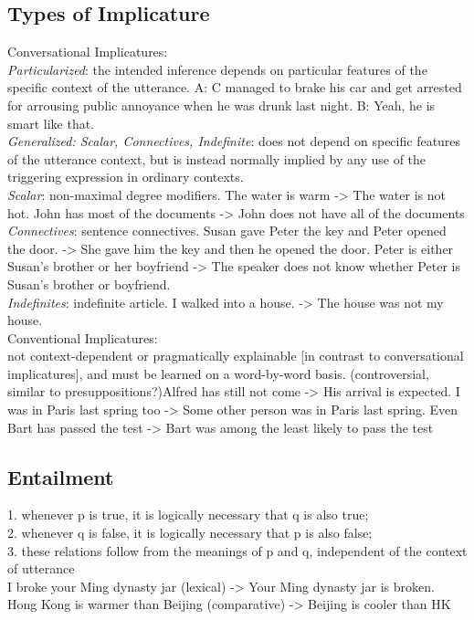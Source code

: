 \subsection*{Types of Implicature}
Conversational Implicatures:\\
\emph{Particularized}: the intended inference depends on particular features of the specific context of the utterance. {\tiny A: C managed to brake his car and get arrested for arrousing
public annoyance when he was drunk last night.
B: Yeah, he is smart like that.}\\
\emph{Generalized: Scalar, Connectives, Indefinite}: does not depend
on specific features of the utterance
context, but is instead normally implied by
any use of the triggering expression in
ordinary contexts.\\
\emph{Scalar}: non-maximal degree modifiers. {\tiny The water is warm -> The water is not hot. John has most of the documents -> John does not have all of the documents}\\
\emph{Connectives}: sentence connectives. {\tiny Susan gave Peter the key and Peter opened the door. -> She gave him the key and then he opened the door. Peter is either Susan’s brother or her boyfriend -> The speaker does not know whether Peter is Susan’s brother or boyfriend.}\\
\emph{Indefinites}: indefinite article. {\tiny I walked into a house. -> The house was not my house.}\\
Conventional Implicatures: \\
not context-dependent or pragmatically explainable [in contrast to conversational implicatures], and must be learned on a word-by-word basis. (controversial, similar to presuppositions?){\tiny Alfred has still not come -> His arrival is expected. I was in Paris last spring too -> Some other person was in Paris last spring. Even Bart has passed the test -> Bart was among the least likely to pass the test}
\subsection*{Entailment}
1. whenever p is true, it is logically necessary that q is also true;\\
2. whenever q is false, it is logically necessary that p is also false;\\
3. these relations follow from the meanings of p and q, independent of the context of utterance\\
{\tiny I broke your Ming dynasty jar (lexical) -> Your Ming dynasty jar is broken. Hong Kong is warmer than Beijing (comparative) -> Beijing is cooler than HK}\\
